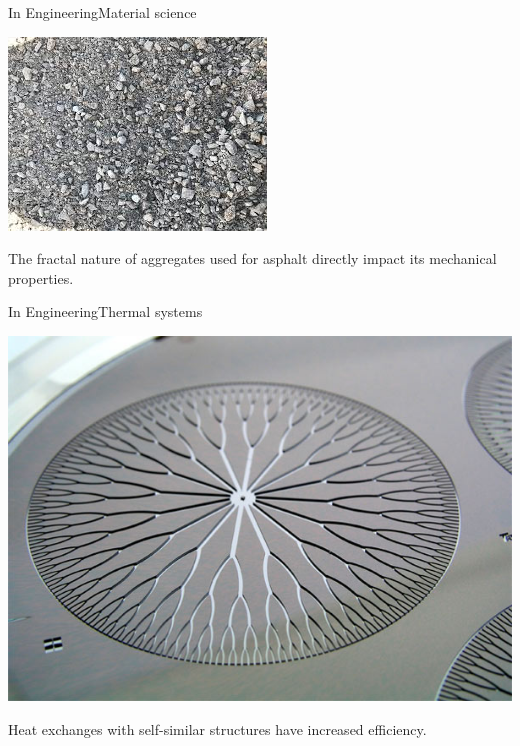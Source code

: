 \documentclass[usenames, dvipsnames, aspectratio=169]{beamer}
\begin{document}
\begin{frame}[t, c]{In Engineering}{Material science}
  \vfill
  \large

  \begin{minipage}{.48\textwidth}
    \centering
    \includegraphics[width=\textwidth]{asphalt}
  \end{minipage}%
  \hfill
  \begin{minipage}{.48\textwidth}
    The fractal nature of aggregates used for asphalt directly impact its mechanical properties.
  \end{minipage}

  \vfill
\end{frame}


\begin{frame}[t, c]{In Engineering}{Thermal systems}
  \vfill
  \large

  \begin{minipage}{.48\textwidth}
    \centering
    \includegraphics[width=\textwidth]{heat_exchange}
  \end{minipage}%
  \hfill
  \begin{minipage}{.48\textwidth}
    Heat exchanges with self-similar structures have increased efficiency.
  \end{minipage}

  \vfill
\end{frame}
\end{document}
